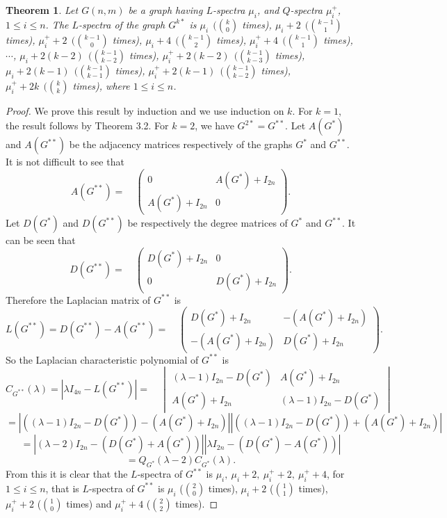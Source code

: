 \documentclass[12pt,a4paper]{amsart}
\newtheorem{theorem}{Theorem}[section]
\theoremstyle{theorem}
\theoremstyle{definition}
\numberwithin{equation}{section} \makeatletter
\begin{document}
\begin{theorem}
Let $G(n,m)$ be a graph having $L$-spectra $\mu_i$, and $Q$-spectra $\mu_i^+$, $1 \leq i \leq n$. The $L$-spectra of the graph $G^{k*}$ is  $\mu_i ~~({k \choose 0}$ times), $\mu_i+2 ~~({k-1 \choose 1}$ times), $\mu_i^{+}+2 ~~({k-1 \choose 0}$ times), $\mu_i+4 ~~({k-1 \choose 2}$ times), $\mu^{+}_i+4 ~~({k-1 \choose 1}$ times), $\cdots$, $\mu_i+2(k-2) ~~({k-1 \choose k-2}$ times), $\mu_i^{+}+2(k-2) ~~({k-1 \choose k-3}$ times), $\mu_i+2(k-1)~~({k-1 \choose k-1}$ times), $\mu_i^{+}+2(k-1)~~({k-1 \choose k-2}$ times), $\mu_i^{+}+2k~~({k \choose k}$ times), where $1\leq i \leq n$.
\end{theorem}
\begin{proof}
We prove this result by induction and we use induction on $k$. For $k=1$, the result follows by Theorem 3.2. For $k=2$, we have $G^{2*}=G^{**}$. Let $A(G^*)$ and $A(G^{**})$ be the adjacency matrices respectively of the graphs $G^*$ and $G^{**}$. It is not difficult to see that
$$A(G^{**})=
\quad\begin{pmatrix}
0 & A(G^*)+I_{2n} \\
A(G^*)+I_{2n} & 0
\end{pmatrix}.$$
Let $D(G^*)$ and $D(G^{**})$ be respectively the degree matrices of $G^*$ and $G^{**}$. It can be seen that $$D(G^{**})=
\quad
\begin{pmatrix}
D(G^*)+I_{2n} & 0\\
0 & D(G^*)+I_{2n}
\end{pmatrix}.$$
Therefore the Laplacian matrix of $G^{**}$ is $$L(G^{**})=D(G^{**})-A(G^{**})
=\quad
\begin{pmatrix}
D(G^*)+I_{2n} & -(A(G^*)+I_{2n}) \\
-(A(G^*)+I_{2n}) & D(G^*)+I_{2n}
\end{pmatrix}.$$
So the Laplacian characteristic polynomial of $G^{**}$ is
$$C_{G^{**}}(\lambda)= |\lambda I_{4n}-L(G^{**})|=
\quad
\begin{vmatrix}
(\lambda-1)I_{2n}-D(G^*) & A(G^*)+I_{2n} \\
A(G^*)+I_{2n} & (\lambda-1)I_{2n}-D(G^*)
\end{vmatrix}$$
$$=\left |((\lambda-1)I_{2n}-D(G^*))-(A(G^*)+I_{2n})\right |\left |((\lambda-1)I_{2n}-D(G^*))+(A(G^*)+I_{2n}) \right|$$
$$=\left |(\lambda-2)I_{2n}-(D(G^*)+A(G^*)) \right| \left| \lambda I_{2n}-(D(G^*)-A(G^*)) \right|$$
$$= Q_{G^*}(\lambda-2)C_{G^*}(\lambda).$$
From this it is clear that the $L$-spectra of $G^{**}$ is $\mu_i,~\mu_i+2,~\mu_i^{+}+2,~\mu_i^{+}+4$, for $1 \leq i \leq n$, that is $L$-spectra of $G^{**}$ is $\mu_i$ (${2 \choose 0}$ times), $\mu_i+2$ (${1 \choose 1}$ times), $\mu_i^{+}+2$ (${1 \choose 0}$ times)  and $\mu_i^{+}+4$ (${2 \choose 2}$ times).

\end{proof}
\end{document}
